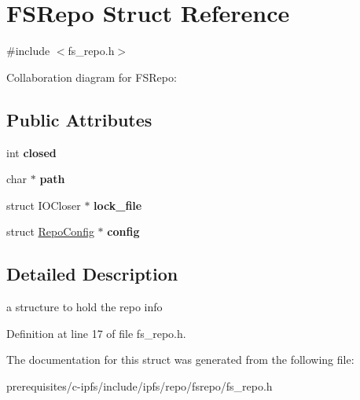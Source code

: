 \hypertarget{struct_f_s_repo}{}\section{F\+S\+Repo Struct Reference}
\label{struct_f_s_repo}


{\ttfamily \#include $<$fs\+\_\+repo.\+h$>$}



Collaboration diagram for F\+S\+Repo\+:
\subsection*{Public Attributes}
\begin{DoxyCompactItemize}
\item 
\mbox{\label{struct_f_s_repo_a43017501c76d7455e353cac9ec5828e0}} 
int {\bfseries closed}
\item 
\mbox{\label{struct_f_s_repo_a20ab7c77d09c862cbaf5130963075f91}} 
char $\ast$ {\bfseries path}
\item 
\mbox{\label{struct_f_s_repo_a407d3f3a5805bb87ba4532bb4a7de709}} 
struct I\+O\+Closer $\ast$ {\bfseries lock\+\_\+file}
\item 
\mbox{\label{struct_f_s_repo_a8f0336c1059f02cd0d5158a8e57ff9ef}} 
struct \mbox{\hyperlink{struct_repo_config}{Repo\+Config}} $\ast$ {\bfseries config}
\end{DoxyCompactItemize}


\subsection{Detailed Description}
a structure to hold the repo info 

Definition at line 17 of file fs\+\_\+repo.\+h.



The documentation for this struct was generated from the following file\+:\begin{DoxyCompactItemize}
\item 
prerequisites/c-\/ipfs/include/ipfs/repo/fsrepo/fs\+\_\+repo.\+h\end{DoxyCompactItemize}
